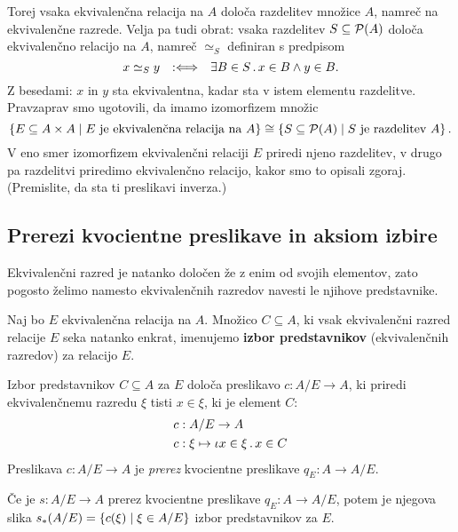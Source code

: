 Torej vsaka ekvivalenčna relacija na $A$ določa razdelitev množice $A$, namreč na
ekvivalenčne razrede. Velja pa tudi obrat: vsaka razdelitev $S \subseteq \mathcal{P}(A)$ določa ekvivalenčno
relacijo na $A$, namreč $\simeq_S$ definiran s predpisom
\begin{equation*}
    x \simeq_S y \quad {{:}{\Longleftrightarrow}}\quad \exists B \in S \,.\, x \in B \land y \in B.
\end{equation*}
%
Z besedami: $x$ in $y$ sta ekvivalentna, kadar sta v istem elementu razdelitve. Pravzaprav
smo ugotovili, da imamo izomorfizem množic
%
\begin{equation*}
  \left\{ E \subseteq A \times A \; \middle| \; \text{$E$ je ekvivalenčna relacija na $A$} \right\} \cong
  \left\{ S \subseteq \mathcal{P}(A) \; \middle| \; \text{$S$ je razdelitev $A$} \right\}.
\end{equation*}
%
V eno smer izomorfizem ekvivalenčni relaciji $E$ priredi njeno razdelitev, v drugo pa razdelitvi priredimo ekvivalenčno
relacijo, kakor smo to opisali zgoraj. (Premislite, da sta ti preslikavi inverza.)


\subsection{Prerezi kvocientne preslikave in aksiom izbire}

Ekvivalenčni razred je natanko določen že z enim od svojih elementov, zato pogosto želimo
namesto ekvivalenčnih razredov navesti le njihove predstavnike.

\begin{definicija}
  Naj bo $E$ ekvivalenčna relacija na $A$. Množico $C \subseteq A$, ki vsak
  ekvivalenčni razred relacije $E$ seka natanko enkrat, imenujemo \textbf{izbor predstavnikov}
  (ekvivalenčnih razredov) za relacijo $E$.
\end{definicija}

Izbor predstavnikov $C \subseteq A$ za $E$ določa preslikavo $c : A/E \to A$, ki priredi
ekvivalenčnemu razredu $\xi$ tisti $x \in \xi$, ki je element $C$:
%
\begin{align*}
  c &: A/E \to A \\
  c &: \xi \mapsto \iota x \in \xi \,.\, x \in C
\end{align*}
%
Preslikava $c : A/E \to A$ je \emph{prerez} kvocientne preslikave $q_E : A \to A/E$.

\begin{izjava}
  Če je $s : A/E \to A$ prerez kvocientne preslikave $q_E : A \to A/E$, potem je
  njegova slika $s_{*}(A/E) = \left\{ c(\xi) \; \middle| \; \xi \in A/E \right\}$ izbor predstavnikov za $E$.
\end{izjava}

